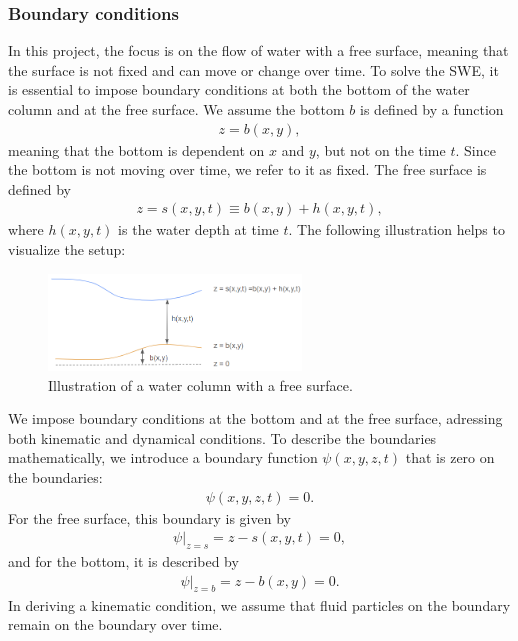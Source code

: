 \subsubsection*{Boundary conditions}
In this project, the focus is on the flow of water with a free surface, meaning that the surface is not fixed and can move or change over time.
To solve the SWE, it is essential to impose boundary conditions at both the bottom of the water column and at the free surface.
We assume the bottom $b$ is defined by a function
\begin{align*}
    z = b(x,y),
\end{align*}
meaning that the bottom is dependent on $x$ and $y$, but not on the time $t$.
Since the bottom is not moving over time, we refer to it as fixed.
The free surface is defined by 
\begin{align*}
    z = s(x,y,t) \equiv b(x,y) + h(x,y,t),
\end{align*}
where $h(x,y,t)$ is the water depth at time $t$.
The following illustration helps to visualize the setup:
\begin{figure}[H]
    \centering
    \includegraphics[width=0.6\textwidth]{figs/water-column-bc.png}
    \caption{Illustration of a water column with a free surface.}\label{fig:water_column_bc}
\end{figure}
We impose boundary conditions at the bottom and at the free surface, adressing both kinematic and dynamical conditions.
To describe the boundaries mathematically, we introduce a boundary function $\psi(x,y,z,t)$ that is zero on the boundaries:
\begin{align*}
    \psi(x,y,z,t) = 0.
\end{align*}
For the free surface, this boundary is given by
\begin{align}\label{eq:psi_free_surface}
    \psi|_{z = s} = z - s(x,y,t) = 0,
\end{align}
and for the bottom, it is described by
\begin{align}\label{eq:psi_bottom}
    \psi|_{z = b} = z - b(x,y) = 0.
\end{align}
In deriving a kinematic condition, we assume that fluid particles on the boundary remain on the boundary over time.
